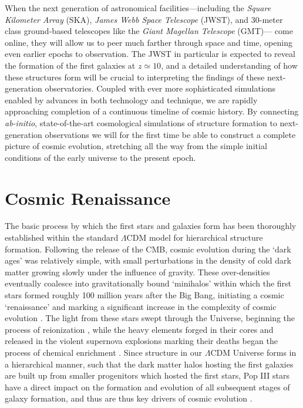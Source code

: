 \documentclass[../thesis.tex]{subfiles}
\begin{document}
When the next generation of astronomical facilities---including the \textit{Square Kilometer Array} (SKA), \textit{James Webb Space Telescope} (JWST), and 30-meter class ground-based telescopes like the \textit{Giant Magellan Telescope} (GMT)--- come online, they will allow us to peer much farther through space and time, opening even earlier epochs to observation.
The JWST in particular is expected to reveal the formation of the first galaxies at $z\simeq10$, and a detailed understanding of how these structures form will be crucial to interpreting the findings of these next-generation observatories.
Coupled with ever more sophisticated simulations enabled by advances in both technology and technique, we are rapidly approaching completion of a continuous timeline of cosmic history. 
By connecting \textit{ab-initio}, state-of-the-art cosmological simulations of structure formation to next-generation observations we will for the first time be able to construct a complete picture of cosmic evolution, stretching all the way from the simple initial conditions of the early universe to the present epoch.

\section{Cosmic Renaissance}
The basic process by which the first stars and galaxies form has been thoroughly established within the standard $\Lambda$CDM model for hierarchical structure formation.
Following the release of the CMB, cosmic evolution during the `dark ages' was relatively simple, with small perturbations in the density of cold dark matter 
growing slowly under the influence of gravity.
These over-densities eventually coalesce into gravitationally bound `minihalos' within which the first stars formed roughly 100 million years after the Big Bang, initiating a cosmic `renaissance' and marking a significant increase in the complexity of cosmic evolution \citep{BarkanaLoeb2001, Miralda-Escude2003, Brommetal2009, Loeb2010}.
The light from these stars swept through the Universe, beginning the process of reionization \citep[e.g.,][]{Meiksin2009}, while the heavy elements forged in their cores and released in the violent supernova explosions marking their deaths began the process of chemical enrichment \citep[e.g.,][]{KarlssonBrommHawthorn2013}.
Since structure in our $\Lambda$CDM Universe forms in a hierarchical manner, such that the dark matter halos hosting the first galaxies are built up from smaller progenitors which hosted the first stars, Pop III stars have a direct impact on the formation and evolution of all subsequent stages of galaxy formation, and thus are thus key drivers of cosmic evolution \citep{Bromm2013}.  
\end{document}
